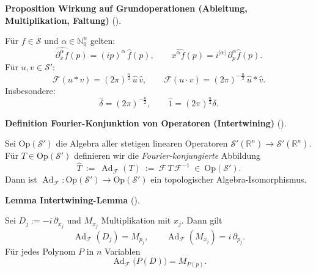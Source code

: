 \documentclass[10pt, letterpaper]{article}
\newcommand{\Ad}{\operatorname{Ad}}
\newcommand{\R}{\mathbb{R}}
\newcommand{\N}{\mathbb{N}}
\newcommand{\CustomHeading}[3]{%
  \par\medskip\noindent%
  \textbf{#1 #2} \textnormal{(#3)}.\enskip%
}
\newenvironment{DEF}[2]{\begin{unitbox}\CustomHeading{Definition}{#1}{#2}}{\end{unitbox}}
\newenvironment{PROP}[2]{\begin{unitbox}\CustomHeading{Proposition}{#1}{#2}}{\end{unitbox}}
\newenvironment{LEM}[2]{\begin{unitbox}\CustomHeading{Lemma}{#1}{#2}}{\end{unitbox}}
\begin{document}


\begin{PROP}{Wirkung auf Grundoperationen (Ableitung, Multiplikation, Faltung)}{}
Für $f\in\mathcal{S}$ und $\alpha\in\N_0^n$ gelten:
\[
\widehat{\partial_x^\alpha f}(p)=(ip)^\alpha\,\hat f(p),\qquad
\widehat{x^\alpha f}(p)=i^{|\alpha|}\,\partial_p^\alpha \hat f(p).
\]
Für $u,v\in\mathcal{S}'$:
\[
\mathcal{F}(u*v)=(2\pi)^{\frac{n}{2}}\,\hat u\,\hat v,\qquad
\mathcal{F}(u\cdot v)=(2\pi)^{-\frac{n}{2}}\,\hat u*\hat v.
\]
Insbesondere:
\[
\widehat{\delta}=(2\pi)^{-\frac{n}{2}},\qquad
\widehat{1}=(2\pi)^{\frac{n}{2}}\delta.
\]
\end{PROP}



\begin{DEF}{Fourier-Konjunktion von Operatoren (Intertwining)}{}
Sei $\mathrm{Op}(\mathcal{S}')$ die Algebra aller stetigen linearen Operatoren $\mathcal{S}'(\R^n)\to\mathcal{S}'(\R^n)$.
Für $T\in\mathrm{Op}(\mathcal{S}')$ definieren wir die \emph{Fourier-konjungierte} Abbildung
\[
\widehat{T}\ :=\ \Ad_{\mathcal{F}}(T)\ :=\ \mathcal{F}\,T\,\mathcal{F}^{-1}\ \in\ \mathrm{Op}(\mathcal{S}').
\]
Dann ist $\Ad_{\mathcal{F}}:\mathrm{Op}(\mathcal{S}')\to\mathrm{Op}(\mathcal{S}')$ ein topologischer Algebra-Isomorphismus.
\end{DEF}

\begin{LEM}{Intertwining-Lemma}{}
Sei $D_j:=-i\,\partial_{x_j}$ und $M_{x_j}$ Multiplikation mit $x_j$. Dann gilt
\[
\Ad_{\mathcal{F}}(D_j)=M_{p_j},\qquad
\Ad_{\mathcal{F}}(M_{x_j})=i\,\partial_{p_j}.
\]
Für jedes Polynom $P$ in $n$ Variablen
\[
\Ad_{\mathcal{F}}\big(P(D)\big)=M_{P(p)}.
\]


\begin{center}
\end{center}
\end{LEM}

\end{document}
